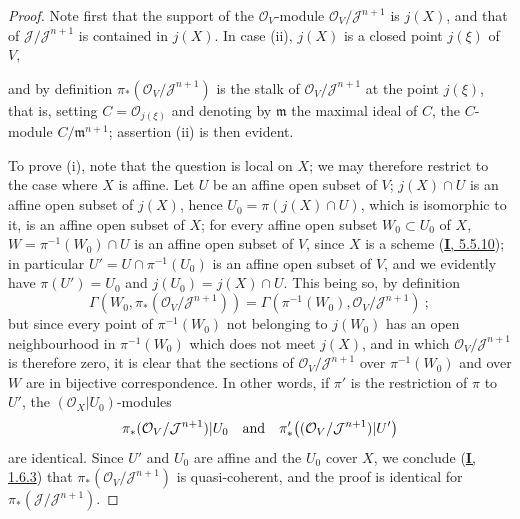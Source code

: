 \begin{proof}
Note first that the support of the $\mathcal{O}_V$-module
$\mathcal{O}_V/\mathcal{J}^{n+1}$ is $j(X)$, and that of
$\mathcal{J}/\mathcal{J}^{n+1}$ is contained in $j(X)$. In case (ii),
$j(X)$ is a closed point $j(\xi)$ of $V$,

and by definition $\pi_*(\mathcal{O}_V/\mathcal{J}^{n+1})$ is the stalk of
$\mathcal{O}_V/\mathcal{J}^{n+1}$ at the point $j(\xi)$, that is, setting
$C=\mathcal{O}_{j(\xi)}$ and denoting by $\mathfrak{m}$ the maximal ideal
of $C$, the $C$-module $C/\mathfrak{m}^{n+1}$; assertion (ii) is then
evident.

To prove (i), note that the question is local on $X$; we may therefore
restrict to the case where $X$ is affine. Let $U$ be an affine open subset of
$V$; $j(X)\cap U$ is an affine open subset of $j(X)$, hence
$U_0=\pi(j(X)\cap U)$, which is isomorphic to it, is an affine open subset of
$X$; for every affine open subset $W_0\subset U_0$ of $X$,
$W=\pi^{-1}(W_0)\cap U$ is an affine open subset of $V$, since $X$ is a
scheme (\hyperref[I.5.5.10]{\textbf{I}, 5.5.10}); in particular
$U'=U\cap\pi^{-1}(U_0)$ is an affine open subset of $V$, and we evidently have
$\pi(U')=U_0$ and $j(U_0)=j(X)\cap U$. This being so, by definition
\[
  \Gamma(W_0,\pi_*(\mathcal{O}_V/\mathcal{J}^{n+1}))
  =\Gamma(\pi^{-1}(W_0),\mathcal{O}_V/\mathcal{J}^{n+1})~;
\]
but since every point of $\pi^{-1}(W_0)$ not belonging to $j(W_0)$ has an
open neighbourhood in $\pi^{-1}(W_0)$ which does not meet $j(X)$, and in
which $\mathcal{O}_V/\mathcal{J}^{n+1}$ is therefore zero, it is clear that
the sections of $\mathcal{O}_V/\mathcal{J}^{n+1}$ over $\pi^{-1}(W_0)$ and
over $W$ are in bijective correspondence. In other words, if $\pi'$ is
the restriction of $\pi$ to $U'$, the $(\mathcal{O}_X|U_0)$-modules
\[
  \pi_*(\mathcal{O}_V/\mathcal{J}^{n+1})|U_0
  \quad\hbox{and}\quad
  \pi'_*\bigl((\mathcal{O}_V/\mathcal{J}^{n+1})|U'\bigr)
\]
are identical. Since $U'$ and $U_0$ are affine and the $U_0$ cover
$X$, we conclude (\hyperref[I.1.6.3]{\textbf{I}, 1.6.3}) that
$\pi_*(\mathcal{O}_V/\mathcal{J}^{n+1})$ is quasi-coherent, and the
proof is identical for
$\pi_*(\mathcal{J}/\mathcal{J}^{n+1})$.


\end{proof}
